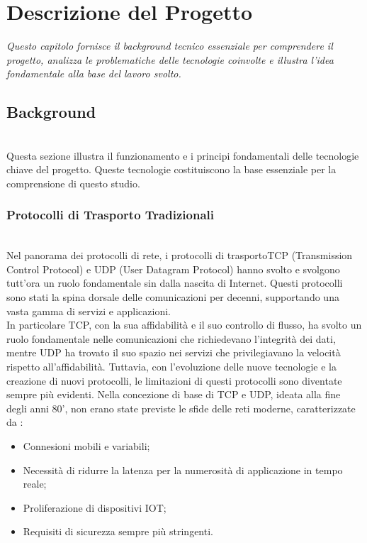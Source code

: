 \chapter{Descrizione del Progetto}
\label{cap:descrizione}

\textit{\indent Questo capitolo fornisce il background tecnico essenziale per comprendere il progetto, analizza le problematiche delle tecnologie coinvolte e illustra l'idea fondamentale alla base del lavoro svolto.}

\section{Background}

~\\
\indent Questa sezione illustra il funzionamento e i principi fondamentali delle tecnologie chiave del progetto.
Queste tecnologie costituiscono la base essenziale per la comprensione di questo studio. 

\subsection{Protocolli di Trasporto Tradizionali}
~\\
\indent Nel panorama dei \gls{protocolli di rete}\glsfirstoccur, i \gls{protocolli di trasporto}\glsfirstoccur TCP (Transmission Control Protocol) e UDP (User Datagram Protocol) hanno svolto e svolgono tutt'ora un ruolo fondamentale sin dalla nascita di Internet.
Questi protocolli sono stati la spina dorsale delle comunicazioni per decenni, supportando una vasta gamma di servizi e applicazioni.\\
In particolare TCP, con la sua affidabilità e il suo controllo di flusso, ha svolto un ruolo fondamentale nelle comunicazioni che richiedevano l'integrità dei dati, mentre UDP ha trovato il suo spazio nei servizi che privilegiavano la velocità rispetto all'affidabilità. 
Tuttavia, con l'evoluzione delle nuove tecnologie e la creazione di nuovi protocolli, le limitazioni di questi protocolli sono diventate sempre più evidenti. Nella concezione di base di TCP e UDP, ideata alla fine degli anni 80', non erano state previste le sfide delle reti moderne, 
caratterizzate da :  
\begin{itemize}
    \item Connesioni mobili e variabili;
    
    \item Necessità di ridurre la latenza per la numerosità di applicazione in tempo reale;
    
    \item Proliferazione di dispositivi IOT;
     
    \item Requisiti di sicurezza sempre più stringenti.
\end{itemize}

